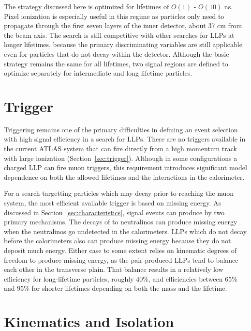 The strategy discussed here is optimized for lifetimes of $O(1)$ - $O(10)$ ns. 
Pixel ionization is especially useful in this regime as particles only need to propagate through the first seven layers of the inner detector, about 37 cm from the beam axis. 
The search is still competitive with other searches for \acp{LLP} at longer lifetimes, because the primary discriminating variables are still applicable even for particles that do not decay within the detector. 
Although the basic strategy remains the same for all lifetimes, two signal regions are defined to optimize separately for intermediate and long lifetime particles.



\section{Trigger}

Triggering remains one of the primary difficulties in defining an event selection with high signal efficiency in a search for \acp{LLP}. 
There are no triggers available in the current ATLAS system that can fire directly from a high momentum track with large ionization (Section~\ref{sec:trigger}). 
Although in some configurations a charged \ac{LLP} can fire muon triggers, this requirement introduces significant model dependence on both the allowed lifetimes and the interactions in the calorimeter.

For a search targetting particles which may decay prior to reaching the muon system, the most efficient available trigger is based on missing energy.
As discussed in Section~\ref{sec:characteristics}, signal events can produce \met by two primary mechanisms.
The decays of \rhadrons to neutralinos can produce missing energy when the neutralinos go undetected in the calorimeters.
\acp{LLP} which do not decay before the calorimeters also can produce missing energy because they do not deposit much energy. 
Either case to some extent relies on kinematic degrees of freedom to produce missing energy, as the pair-produced \acp{LLP} tend to balance each other in the transverse plain.
That balance results in a relatively low efficiency for long-lifetime particles, roughly 40\%, and efficiencies between 65\% and 95\% for shorter lifetimes depending on both the mass and the lifetime.


\section{Kinematics and Isolation}
\label{sec:track_requirements}


